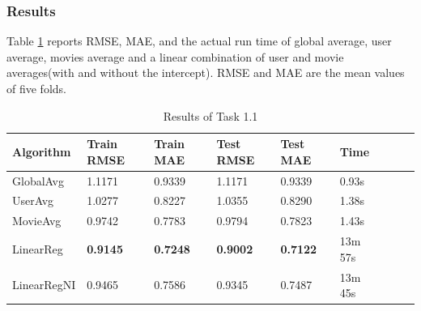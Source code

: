 \documentclass{article}
\begin{document}
\subsubsection{Results}
Table \ref{tab:1.1-results} reports RMSE, MAE, and the actual run time of global average, user average, movies average and a linear combination of user and movie averages(with and without the intercept). RMSE and MAE are the mean values of five folds.
\begin{table}[ht]
    \centering
    \caption{Results of Task 1.1}
    \label{tab:1.1-results}
    \begin{threeparttable}
    \begin{tabular}{lllllllll}
        \toprule
        \textbf{Algorithm}  & \textbf{Train RMSE} & \textbf{Train MAE} & \textbf{Test RMSE} & \textbf{Test MAE} & \textbf{Time}\\
        \midrule
        GlobalAvg & 1.1171 & 0.9339 & 1.1171 & 0.9339 & 0.93s\\
        UserAvg & 1.0277 & 0.8227 & 1.0355 & 0.8290 & 1.38s\\
        MovieAvg & 0.9742 & 0.7783 & 0.9794 & 0.7823 & 1.43s\\
        LinearReg & \textbf{0.9145} & \textbf{0.7248} & \textbf{0.9002} & \textbf{0.7122} & 13m 57s\\
        LinearRegNI & 0.9465 & 0.7586 & 0.9345 & 0.7487 & 13m 45s\\
        \bottomrule
    \end{tabular}
    \end{threeparttable}
\end{table}
\end{document}
